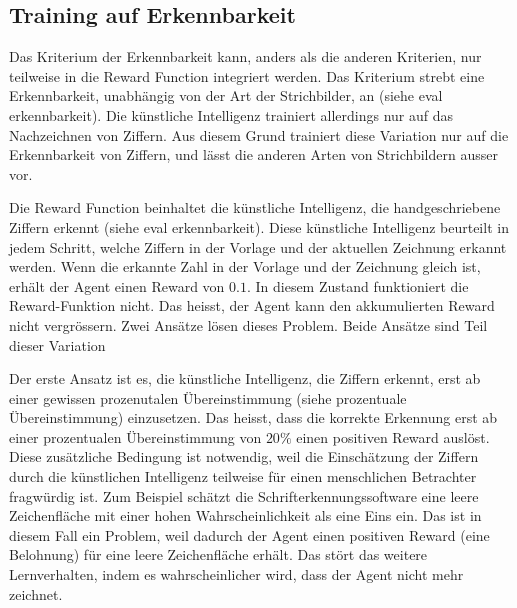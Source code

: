 

\subsection{Training auf Erkennbarkeit}
Das Kriterium der Erkennbarkeit kann, anders als die anderen Kriterien, nur
teilweise in die Reward Function integriert werden. Das Kriterium strebt eine
Erkennbarkeit, unabhängig von der Art der Strichbilder, an (siehe eval
erkennbarkeit). Die künstliche Intelligenz trainiert allerdings nur auf das
Nachzeichnen von Ziffern. Aus diesem Grund trainiert diese Variation nur auf die
Erkennbarkeit von Ziffern, und lässt die anderen Arten von Strichbildern ausser
vor. 

Die Reward Function beinhaltet die künstliche Intelligenz, die handgeschriebene
Ziffern erkennt (siehe eval erkennbarkeit). Diese künstliche Intelligenz
beurteilt in jedem Schritt, welche Ziffern in der Vorlage und der aktuellen
Zeichnung erkannt werden. Wenn die erkannte Zahl in der Vorlage und der
Zeichnung gleich ist, erhält der Agent einen Reward von $0.1$. In diesem Zustand     %
funktioniert die Reward-Funktion nicht. Das heisst, der Agent kann den
akkumulierten Reward nicht vergrössern. Zwei Ansätze lösen dieses Problem. Beide
Ansätze sind Teil dieser Variation

Der erste Ansatz ist es, die künstliche Intelligenz, die Ziffern erkennt, erst
ab einer gewissen prozenutalen Übereinstimmung (siehe prozentuale
Übereinstimmung) einzusetzen. Das heisst, dass die korrekte Erkennung erst ab
einer prozentualen Übereinstimmung von $20\%$ einen positiven Reward auslöst.
Diese zusätzliche Bedingung ist notwendig, weil die Einschätzung der Ziffern
durch die künstlichen Intelligenz teilweise für einen menschlichen Betrachter
fragwürdig ist. Zum Beispiel schätzt die Schrifterkennungssoftware eine leere
Zeichenfläche mit einer hohen Wahrscheinlichkeit als eine Eins ein. Das ist in
diesem Fall ein Problem, weil dadurch der Agent einen positiven Reward (eine
Belohnung) für eine leere Zeichenfläche erhält. Das stört das weitere
Lernverhalten, indem es wahrscheinlicher wird, dass der Agent nicht mehr
zeichnet. 

